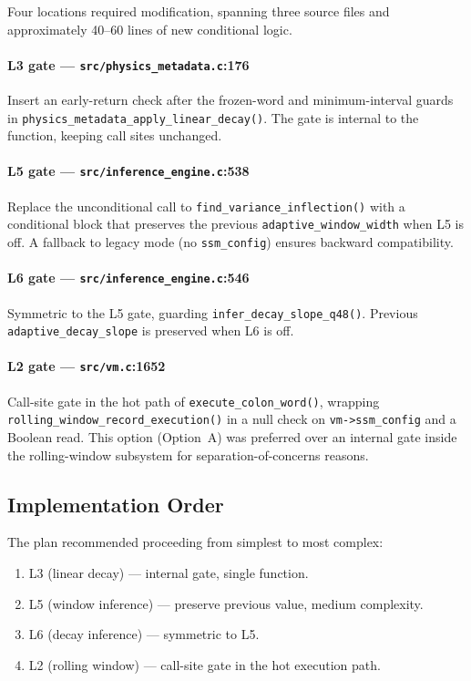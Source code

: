 Four locations required modification, spanning three source files and
approximately 40--60 lines of new conditional logic.

\paragraph{L3 gate — \texttt{src/physics\_metadata.c}:176}
Insert an early-return check after the frozen-word and minimum-interval
guards in \texttt{physics\_metadata\_apply\_linear\_decay()}. The gate is
internal to the function, keeping call sites unchanged.

\paragraph{L5 gate — \texttt{src/inference\_engine.c}:538}
Replace the unconditional call to \texttt{find\_variance\_inflection()} with a
conditional block that preserves the previous \texttt{adaptive\_window\_width}
when L5 is off. A fallback to legacy mode (no \texttt{ssm\_config}) ensures
backward compatibility.

\paragraph{L6 gate — \texttt{src/inference\_engine.c}:546}
Symmetric to the L5 gate, guarding \texttt{infer\_decay\_slope\_q48()}.
Previous \texttt{adaptive\_decay\_slope} is preserved when L6 is off.

\paragraph{L2 gate — \texttt{src/vm.c}:1652}
Call-site gate in the hot path of \texttt{execute\_colon\_word()}, wrapping
\texttt{rolling\_window\_record\_execution()} in a null check on
\texttt{vm->ssm\_config} and a Boolean read. This option (Option~A) was
preferred over an internal gate inside the rolling-window subsystem for
separation-of-concerns reasons.

\subsection{Implementation Order}

The plan recommended proceeding from simplest to most complex:

\begin{enumerate}
  \item L3 (linear decay) — internal gate, single function.
  \item L5 (window inference) — preserve previous value, medium complexity.
  \item L6 (decay inference) — symmetric to L5.
  \item L2 (rolling window) — call-site gate in the hot execution path.
\end{enumerate}

